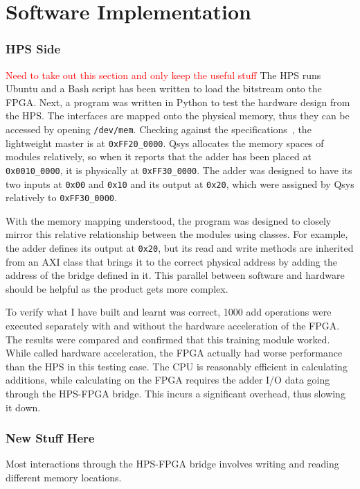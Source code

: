 \chapter{Software Implementation}

\subsection{HPS Side}
\textcolor{red}{Need to take out this section and only keep the useful stuff}
The HPS runs Ubuntu and a Bash script has been written to load the bitstream onto the FPGA.
Next, a program was written in Python to test the hardware design from the HPS.
The interfaces are mapped onto the physical memory, thus they can be accessed by opening \texttt{/dev/mem}.
Checking against the specifications~\cite{Altera6}, the lightweight master is at \texttt{0xFF20\_0000}.
Qsys allocates the memory spaces of modules relatively, so when it reports that the adder has been placed at \texttt{0x0010\_0000}, it is physically at \texttt{0xFF30\_0000}.
The adder was designed to have its two inputs at \texttt{0x00} and \texttt{0x10} and its output at \texttt{0x20}, which were assigned by Qsys relatively to \texttt{0xFF30\_0000}.

With the memory mapping understood, the program was designed to closely mirror this relative relationship between the modules using classes.
For example, the adder defines its output at \texttt{0x20}, but its read and write methods are inherited from an AXI class that brings it to the correct physical address by adding the address of the bridge defined in it.
This parallel between software and hardware should be helpful as the product gets more complex.

To verify what I have built and learnt was correct, 1000 add operations were executed separately with and without the hardware acceleration of the FPGA.
The results were compared and confirmed that this training module worked.
While called hardware acceleration, the FPGA actually had worse performance than the HPS in this testing case.
The CPU is reasonably efficient in calculating additions, while calculating on the FPGA requires the adder I/O data going through the HPS-FPGA bridge.
This incurs a significant overhead, thus slowing it down.

\subsection{New Stuff Here}
Most interactions through the HPS-FPGA bridge involves writing and reading different memory locations.

